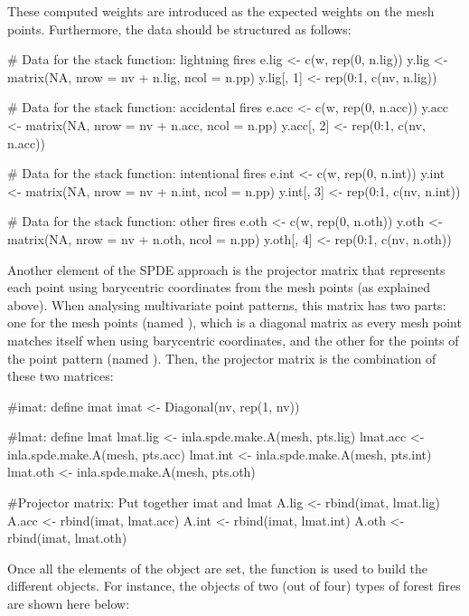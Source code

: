 These computed weights are introduced as the expected weights on the mesh points. Furthermore, the data should be structured as follows:

\begin{example*}
# Data for the stack function: lightning fires
e.lig <- c(w, rep(0, n.lig))
y.lig <- matrix(NA, nrow = nv + n.lig, ncol = n.pp)
y.lig[, 1] <- rep(0:1, c(nv, n.lig))

# Data for the stack function: accidental fires
e.acc <- c(w, rep(0, n.acc))
y.acc <- matrix(NA, nrow = nv + n.acc, ncol = n.pp)
y.acc[, 2] <- rep(0:1, c(nv, n.acc))

# Data for the stack function: intentional fires
e.int <- c(w, rep(0, n.int))
y.int <- matrix(NA, nrow = nv + n.int, ncol = n.pp)
y.int[, 3] <- rep(0:1, c(nv, n.int))

# Data for the stack function: other fires
e.oth <- c(w, rep(0, n.oth))
y.oth <- matrix(NA, nrow = nv + n.oth, ncol = n.pp)
y.oth[, 4] <- rep(0:1, c(nv, n.oth))
\end{example*}

Another element of the SPDE approach is the projector matrix that represents each point using barycentric coordinates from the mesh points (as explained above). When analysing multivariate point patterns, this matrix has two parts: one for the mesh points (named ), which is a diagonal matrix as every mesh point matches itself when using barycentric coordinates, and the other for the points of the point pattern (named ). Then, the projector matrix is the combination of these two matrices:

\begin{example*}
#imat: define imat
imat <- Diagonal(nv, rep(1, nv))

#lmat: define lmat
lmat.lig <- inla.spde.make.A(mesh, pts.lig)
lmat.acc <- inla.spde.make.A(mesh, pts.acc)
lmat.int <- inla.spde.make.A(mesh, pts.int)
lmat.oth <- inla.spde.make.A(mesh, pts.oth)

#Projector matrix: Put together imat and lmat
A.lig <- rbind(imat, lmat.lig)
A.acc <- rbind(imat, lmat.acc)
A.int <- rbind(imat, lmat.int)
A.oth <- rbind(imat, lmat.oth)
\end{example*}

Once all the elements of the  object are set, the  function is used to build the different  objects. For instance, the  objects of two (out of four) types of forest fires are shown here below:

